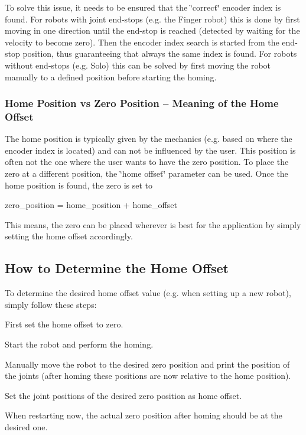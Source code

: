 To solve this issue, it needs to be ensured that the \char`\"{}correct\char`\"{} encoder index is found. For robots with joint end-\/stops (e.\+g. the Finger robot) this is done by first moving in one direction until the end-\/stop is reached (detected by waiting for the velocity to become zero). Then the encoder index search is started from the end-\/stop position, thus guaranteeing that always the same index is found. For robots without end-\/stops (e.\+g. Solo) this can be solved by first moving the robot manually to a defined position before starting the homing.

\subsubsection*{Home Position vs Zero Position – Meaning of the Home Offset}

The home position is typically given by the mechanics (e.\+g. based on where the encoder index is located) and can not be influenced by the user. This position is often not the one where the user wants to have the zero position. To place the zero at a different position, the \char`\"{}home offset\char`\"{} parameter can be used. Once the home position is found, the zero is set to \begin{DoxyVerb}zero_position = home_position + home_offset
\end{DoxyVerb}


This means, the zero can be placed wherever is best for the application by simply setting the home offset accordingly.

\subsection*{How to Determine the Home Offset}

To determine the desired home offset value (e.\+g. when setting up a new robot), simply follow these steps\+:


\begin{DoxyEnumerate}
\item First set the home offset to zero.
\item Start the robot and perform the homing.
\item Manually move the robot to the desired zero position and print the position of the joints (after homing these positions are now relative to the home position).
\item Set the joint positions of the desired zero position as home offset.
\end{DoxyEnumerate}

When restarting now, the actual zero position after homing should be at the desired one. 
